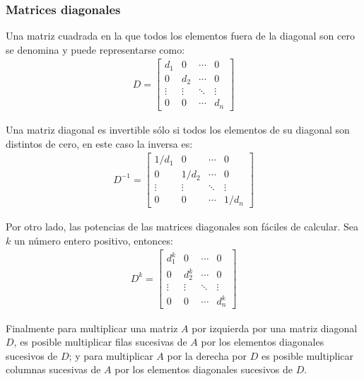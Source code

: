 \documentclass[a4paper,12pt]{article}
\begin{document}
\subsubsection{Matrices diagonales}

\begin{concept}
  Una matriz cuadrada en la que todos los elementos fuera de la diagonal son
  cero se denomina  y puede representarse como:
  \begin{align*}
    D=
  \begin{bmatrix}
    d_1&   0& \cdots& 0 \\
    0&   d_2& \cdots& 0 \\
    \vdots&\vdots & \ddots  &\vdots  \\
    0&   0& \cdots& d_n 
  \end{bmatrix}
  \end{align*}
\end{concept}

Una matriz diagonal es invertible sólo si todos los elementos de su diagonal
son distintos de cero, en este caso la inversa es:
\begin{align*}
  D^{-1}=
\begin{bmatrix}
  1/d_1 &   0   & \cdots  & 0 \\
  0     &  1/d_2& \cdots  & 0 \\
  \vdots&\vdots & \ddots  &\vdots  \\
  0     &   0   & \cdots  & 1/d_n 
\end{bmatrix}
\end{align*}

Por otro lado, las potencias de las matrices diagonales son fáciles de
calcular. Sea $k$ un número entero positivo, entonces:
\begin{align*}
  D^k=
\begin{bmatrix}
  d_1^k &   0   & \cdots  & 0 \\
  0     &  d_2^k& \cdots  & 0 \\
  \vdots&\vdots & \ddots  &\vdots  \\
  0     &   0   & \cdots  & d_n^k 
\end{bmatrix}
\end{align*}

Finalmente para multiplicar una matriz $A$ por izquierda por una matriz
diagonal $D$, es posible multiplicar filas sucesivas de $A$ por los elementos
diagonales sucesivos de $D$; y para multiplicar $A$ por la derecha por
$D$ es posible multiplicar columnas sucesivas de $A$ por los elementos
diagonales sucesivos de $D$.
\end{document}

